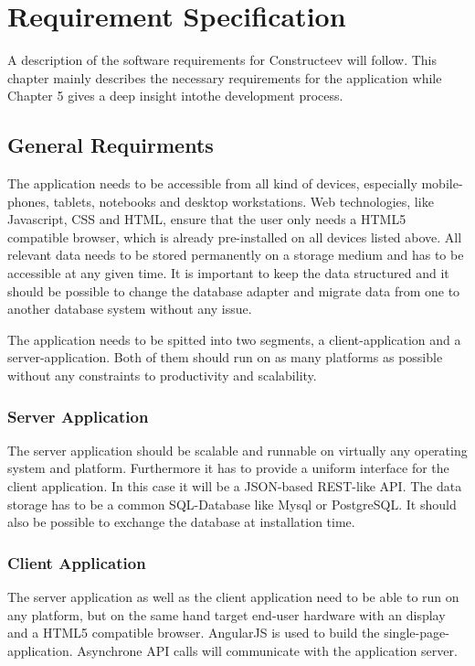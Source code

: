 \chapter{Requirement Specification}

A description of the software requirements for Constructeev will follow. This chapter mainly describes the necessary requirements for the application while Chapter 5 gives a deep insight intothe development process.  
 
\section{General Requirments}
The application needs to be accessible from all kind of devices, especially mobile-phones, tablets, notebooks and desktop workstations. Web technologies, like Javascript, CSS and HTML, ensure that the user only needs a HTML5 compatible browser, which is already pre-installed on all devices listed above.
All relevant data needs to be stored permanently on a storage medium and has to be accessible at any given time. It is important to keep the data structured and it should be possible to change the database adapter and migrate data from one to another database system without any issue.

The application needs to be spitted into two segments, a client-application and a server-application. Both of them should run on as many platforms as possible without any constraints to productivity and scalability. 

\subsection{Server Application}
The server application should be scalable and runnable on virtually any operating system and platform. Furthermore it has to provide a uniform interface for the client application. In this case it will be a JSON-based REST-like API. The data storage has to be a common SQL-Database like Mysql or PostgreSQL. It should also be possible to exchange the database at installation time. 

\subsection{Client Application}
The server application as well as the client application need to be able to run on any platform, but on the same hand target end-user hardware with an display and a HTML5 compatible browser. AngularJS is used to build the single-page-application. Asynchrone API calls will communicate with the application server. 

